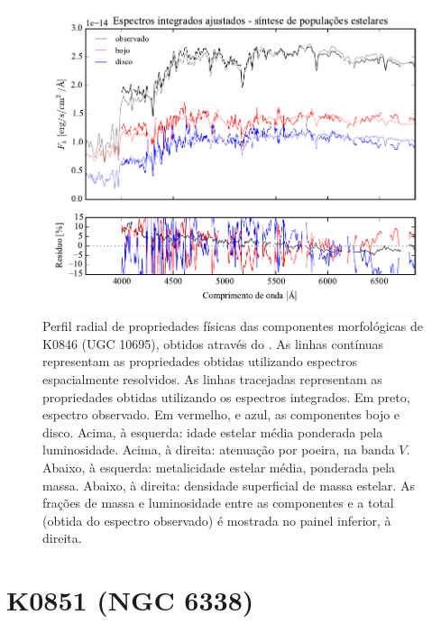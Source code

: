 \begin{figure}
	\includegraphics[page=12]{figuras/sample006a_synthesis}
	\caption[Propriedades físicas das componentes morfológicas de K0846 (UGC 10695)]
	{Perfil radial de propriedades físicas das componentes morfológicas de
	K0846 (UGC 10695), obtidos através do \starlight. As linhas contínuas
	representam as propriedades obtidas utilizando espectros espacialmente
	resolvidos. As linhas tracejadas representam as propriedades obtidas utilizando
	os espectros integrados. Em preto, espectro observado. Em vermelho, e azul, as
	componentes bojo e disco. Acima, à esquerda: idade estelar média ponderada pela
	luminosidade. Acima, à direita: atenuação por poeira, na banda $V$. Abaixo, à
	esquerda: metalicidade estelar média, ponderada pela massa. Abaixo, à direita:
	densidade superficial de massa estelar. As frações de massa e luminosidade
	entre as componentes e a total (obtida do espectro observado) é mostrada no
	painel inferior, à direita.}
	\label{fig:decompSinteseRadprof:K0846}
\end{figure}


\section{K0851 (NGC 6338)}
\label{apendice:Decomp:K0851}

